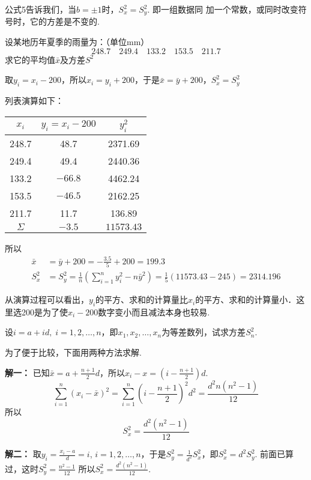 公式5告诉我们，当$b=\pm1$时，$S_x^2=S_y^2$. 即一组数据同
加一个常数，或同时改变符号时，它的方差是不变的.

\begin{example}
设某地历年夏季的雨量为：（单位mm）
\[248.7\quad 249.4\quad 133.2\quad 153.5\quad 211.7 \]
求它的平均值$\bar x$及方差$S^2$
\end{example}

取$y_i=x_i-200$，所以$x_i=y_i+200$，于是$\bar x=\bar y+200$，$S^2_x=S^2_y$

列表演算如下：
\begin{center}
\begin{tabular}{ccc}
\hline 
$x_i$ & $y_i=x_i-200$ & $y^2_i$\\
\hline
248.7  & 48.7  & 2371.69\\
249.4& 49.4&2440.36\\
133.2&$-66.8$&4462.24\\
153.5&$-46.5$&2162.25\\
211.7&11.7&136.89\\
\hline
$\Sigma$ &$-3.5$& $11573.43$\\
\hline
\end{tabular}
\end{center}

所以
\[\begin{split}
    \bar x&=\bar y+200=-\frac{3.5}{5}+200=199.3\\
S^2_x&=S^2_y=\frac{1}{n}\left(\sum^n_{i=1} y^2_i-n\bar y^2\right)=\frac{1}{5}(11573.43-245)=2314.196
\end{split}
    \]

从演算过程可以看出，$y_i$的平方、求和的计算量比$x_i$的平方、求和的计算量小．这里选200是为了使$x_i-200$数字变小而且减法本身也较易.

\begin{example}
    设$i=a+id,\; i=1,2,\ldots,n$，即$x_1,x_2,\ldots,x_n$为等差数列，试求方差$S^2_n$.
\end{example}

为了便于比较，下面用两种方法求解.

\textbf{解一：} 已知$\bar x=a+\frac{n+1}{2}d$，所以$x_i-x=\left(i-\frac{n+1}{2}\right)d$.
\[\sum^n_{i=1}(x_i-\bar x)^2 =\sum^n_{i=1}\left(i-\frac{n+1}{2}\right)^2 d^2=\frac{d^2n(n^2-1)}{12} \]
所以
\[S^2_x=\frac{d^2(n^2-1)}{12} \]

\textbf{解二：} 取$y_i=\frac{x_i-a}{d}=i$, $i=1,2,\ldots,n$，于是$S^2_y=\frac{1}{d^2}S^2_x$，即$S^2_x=d^2S^2_y$. 前面已算过，这时$S^2_y=\frac{n^2-1}{12}$
所以$S^2_x=\frac{d^2(n^2-1)}{12}$.

